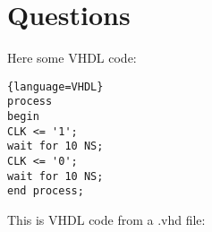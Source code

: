 \noindent \section{Questions} \vspace{-9mm} \hrulefill %

\indent \lipsum[1-2] %

Here some VHDL code:
\begin{lstlisting}{language=VHDL}
process
begin
CLK <= '1'; 
wait for 10 NS;
CLK <= '0'; 
wait for 10 NS;
end process;
\end{lstlisting}

This is VHDL code from a .vhd file:




